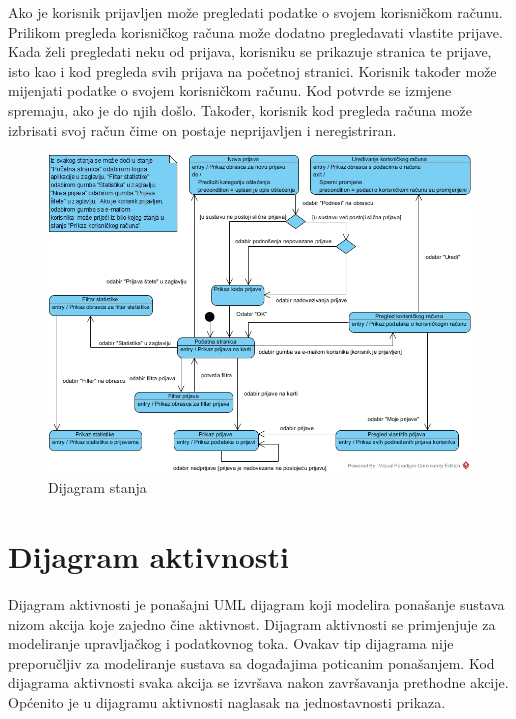 			Ako je korisnik prijavljen može pregledati podatke o svojem korisničkom računu. Prilikom pregleda korisničkog računa može dodatno pregledavati vlastite prijave. Kada želi pregledati neku od prijava, korisniku se prikazuje stranica te prijave, isto kao i kod pregleda svih prijava na početnoj stranici. Korisnik također može mijenjati podatke o svojem korisničkom računu. Kod potvrde se izmjene spremaju, ako je do njih došlo. Također, korisnik kod pregleda računa može izbrisati svoj račun čime on postaje neprijavljen i neregistriran.
			
			\begin{figure}[H]
				\includegraphics[width=\textwidth]{slike/dijagramStanja.jpg} %
				\caption{Dijagram stanja}
				\label{fig:dijagramStanja} %
			\end{figure}
			
			\eject 
			
			\section{Dijagram aktivnosti}
			
			Dijagram aktivnosti je ponašajni UML dijagram koji modelira ponašanje sustava nizom akcija koje zajedno čine aktivnost. Dijagram aktivnosti se primjenjuje za modeliranje upravljačkog i podatkovnog toka. Ovakav tip dijagrama nije preporučljiv za modeliranje sustava sa događajima poticanim ponašanjem. Kod dijagrama aktivnosti svaka akcija se izvršava nakon završavanja prethodne akcije. Općenito je u dijagramu aktivnosti naglasak na jednostavnosti prikaza.
			
